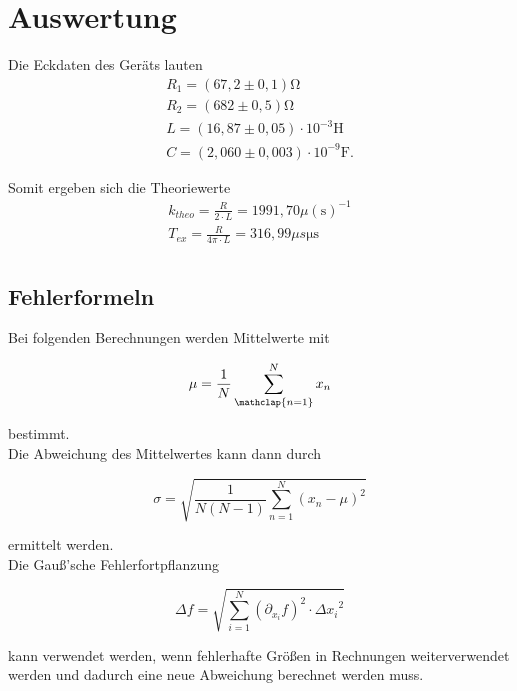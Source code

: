 \section{Auswertung}
\label{sec:Auswertung}

Die Eckdaten des Geräts lauten 
\begin{align*}
  R_1 = (67,2 \pm 0,1) \mathrm{\Omega} \\
  R_2 = (682 \pm 0,5) \mathrm{\Omega} \\
  L = (16,87 \pm 0,05) \cdot 10^{-3}\mathrm{H} \\
  C = (2,060 \pm 0,003) \cdot 10^{-9}\mathrm{F}.   %
\end{align*}


Somit ergeben sich die Theoriewerte 
\begin{align*}
  k_{theo} = \frac{R}{2 \cdot L} = 1991,70 \mu \mathrm{(s)^{-1}} \\
  T_{ex} = \frac{R}{4 \pi \cdot L} = 316,99 \mu s\mathrm{\mu s} \\  %
\end{align*}


\subsection{Fehlerformeln}
\label{subsec:fehler}

Bei folgenden Berechnungen werden Mittelwerte mit
\begin{center}
  \begin{equation}
    \mu = \dfrac{1}{N}\sum\limits_{\mathclap{n=1}}^{N}x_n
  \end{equation}
\end{center}

bestimmt. \\
Die Abweichung des Mittelwertes kann dann durch
\begin{center}
  \begin{equation}
    \sigma=\sqrt{\dfrac{1}{N(N-1)}\sum\limits_{n=1}^{N} (x_n - \mu)^2}
  \end{equation}
\end{center}
ermittelt werden. \\
Die Gauß'sche Fehlerfortpflanzung
\begin{center}
  \begin{equation}
    \Delta f = \sqrt{\sum_{i=1}^{N}\left(\partial_{x_i}f\right)^2\cdot{\Delta x_i}^2}
  \end{equation}
\end{center}
kann verwendet werden, wenn fehlerhafte Größen in Rechnungen weiterverwendet werden und dadurch eine neue Abweichung
berechnet werden muss.




